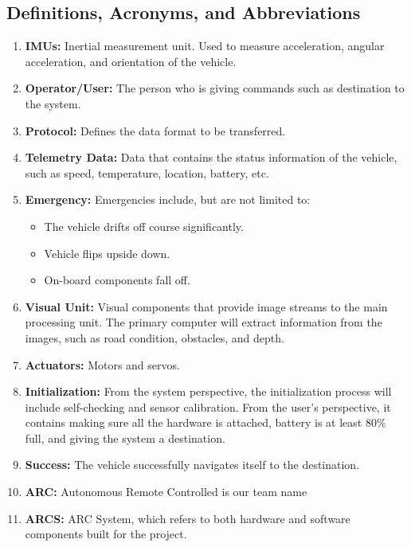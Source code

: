 \documentclass[compsoc,draftclsnofoot,onecolumn,10pt]{IEEEtran}
\begin{document}
\subsection{Definitions, Acronyms, and Abbreviations} %
\begin{enumerate}
	\item \textbf{IMUs:} Inertial measurement unit. Used to measure acceleration, angular acceleration, and orientation of the vehicle.
	\item \textbf{Operator/User:} The person who is giving commands such as destination to the system.
	\item \textbf{Protocol:} Defines the data format to be transferred.
	\item \textbf{Telemetry Data:} Data that contains the status information of the vehicle, such as speed, temperature, location, battery, etc.
	\item \textbf{Emergency:} Emergencies include, but are not limited to: 
	\begin{itemize}
		\item The vehicle drifts off course significantly.
		\item Vehicle flips upside down.
		\item On-board components fall off.
	\end{itemize}
	\item \textbf{Visual Unit:} Visual components that provide image streams to the main processing unit. 
	The primary computer will extract information from the images, such as road condition, obstacles, and depth. 
	\item \textbf{Actuators:} Motors and servos.
	\item \textbf{Initialization:} From the system perspective, the initialization process will include self-checking and sensor calibration. 
	From the user's perspective, it contains making sure all the hardware is attached, battery is at least 80\% full, and giving the system a destination. 
	\item \textbf{Success:} The vehicle successfully navigates itself to the destination.
	\item \textbf{ARC:} Autonomous Remote Controlled is our team name
	\item \textbf{ARCS:} ARC System, which refers to both hardware and software components built for the project.

\end{enumerate}
\end{document}

